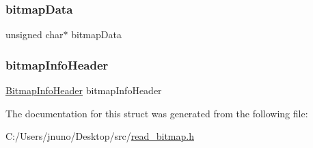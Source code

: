 \subsubsection{\texorpdfstring{bitmap\+Data}{bitmapData}}
{\footnotesize\ttfamily unsigned char$\ast$ bitmap\+Data}

\hypertarget{struct_bitmap_a7157ca7f3ce4be47481c472fafd89313}{}\label{struct_bitmap_a7157ca7f3ce4be47481c472fafd89313} 
\subsubsection{\texorpdfstring{bitmap\+Info\+Header}{bitmapInfoHeader}}
{\footnotesize\ttfamily \hyperlink{struct_bitmap_info_header}{Bitmap\+Info\+Header} bitmap\+Info\+Header}



The documentation for this struct was generated from the following file\+:\begin{DoxyCompactItemize}
\item 
C\+:/\+Users/jnuno/\+Desktop/src/\hyperlink{read__bitmap_8h}{read\+\_\+bitmap.\+h}\end{DoxyCompactItemize}
